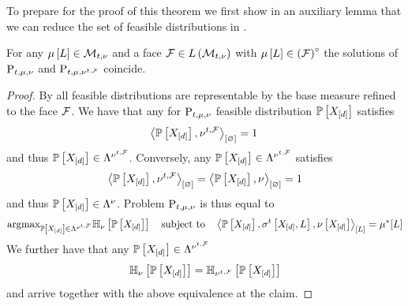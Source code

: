 To prepare for the proof of this theorem we first show in an auxiliary lemma that we can reduce the set of feasible distributions in .

\begin{lemma}
    \label{lem:maxEntReduction}
    For any $\mu\left[L\right]\in\mathcal{M}_{t,\nu}$ and a face $\mathcal{F}\in L\left(\mathcal{M}_{t,\nu}\right)$ with $\mu\left[L\right]\in{\left(\mathcal{F}\right)}^{\circ}$ the solutions of $\mathrm{P}_{t,\mu,\nu}$ and $\mathrm{P}_{t,\mu,\nu^{t,\mathcal{F}}}$ coincide.
\end{lemma}
\begin{proof}
    By  all feasible distributions are representable by the base measure refined to the face $\mathcal{F}$.
    We have that any for $\mathrm{P}_{t,\mu,\nu}$ feasible distribution $\mathbb{P}\left[X_{[d]}\right]$ satisfies
    \begin{align*}
        \left\langle \mathbb{P}\left[X_{[d]}\right],\nu^{t,\mathcal{F}}\right\rangle_{\left[ \varnothing \right]} = 1 \,
    \end{align*}
    and thus $\mathbb{P}\left[X_{[d]}\right]\in\Lambda^{\nu^{t,\mathcal{F}}}$.
    Conversely, any $\mathbb{P}\left[X_{[d]}\right]\in\Lambda^{\nu^{t,\mathcal{F}}}$ satisfies
    \begin{align*}
        \left\langle \mathbb{P}\left[X_{[d]}\right],\nu^{t,\mathcal{F}}\right\rangle_{\left[ \varnothing \right]} = \left\langle \mathbb{P}\left[X_{[d]}\right],\nu\right\rangle_{\left[ \varnothing \right]} = 1
    \end{align*}
    and thus $\mathbb{P}\left[X_{[d]}\right]\in\Lambda^{\nu}$.
    Problem $\mathrm{P}_{t,\mu,\nu}$ is thus equal to
    \begin{align*}
        \mathrm{argmax}_{\mathbb{P}\left[X_{[d]}\right]\in\Lambda^{\nu^{t,\mathcal{F}}}} \mathbb{H}_{\nu}\left[\mathbb{P}\left[X_{[d]}\right]\right]
        \quad \text{subject to} \quad
        \left\langle \mathbb{P}\left[X_{[d]}\right],\sigma^{t}\left[X_{[d]},L\right],\nu\left[X_{[d]}\right]\right\rangle_{\left[ L \right]}
        = \mu^*[L]
    \end{align*}
    We further have that any $\mathbb{P}\left[X_{[d]}\right]\in\Lambda^{\nu^{t,\mathcal{F}}}$
    \begin{align*}
        \mathbb{H}_{\nu}\left[\mathbb{P}\left[X_{[d]}\right]\right] = \mathbb{H}_{\nu^{t,\mathcal{F}}}\left[\mathbb{P}\left[X_{[d]}\right]\right]
    \end{align*}
    and arrive together with the above equivalence at the claim.
\end{proof}


